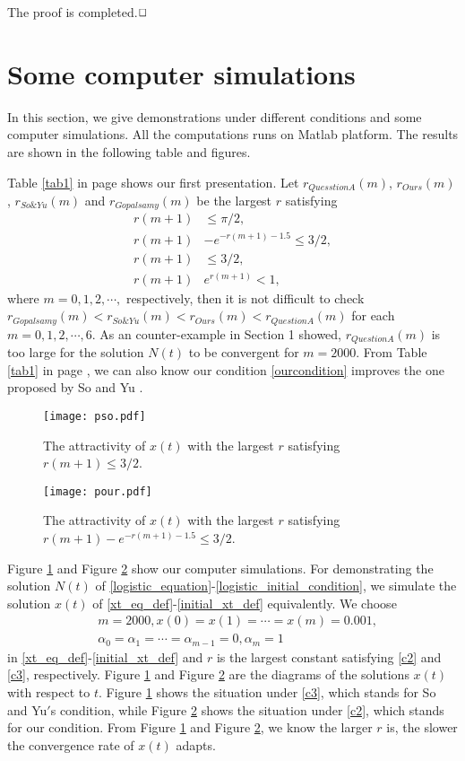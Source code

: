 \documentclass{HZNUMCM}
\begin{document}
The proof is completed.$\hfill\Box$


\section{Some computer simulations}

In this section, we give  demonstrations under different conditions and some computer simulations. All the computations runs on Matlab platform. The results are shown in the following table and figures.

Table \ref{tab1}  in page \pageref{tab1}  shows our first presentation. Let $r_{QuesstionA}(m)$, $r_{Ours}(m)$, $r_{So\&Yu}(m)$ and $r_{Gopalsamy}(m)$ be the largest $r$ satisfying
\begin{align}
r(m+1)&\leqslant \pi/2\label{c1},\\
r(m+1)&-e^{-r(m+1)-1.5}\leqslant 3/2\label{c2},\\
r(m+1)&\leqslant 3/2\label{c3},\\
r(m+1)&e^{r(m+1)}<1\label{c4},
\end{align}
where $m=0,1,2,\cdots,$ respectively,  then it is not difficult to check
$r_{Gopalsamy}(m)< r_{So\&Yu}(m)<r_{Ours}(m)<r_{QuestionA}(m)$
for each $m=0,1,2,\cdots,6.$ As an counter-example  in Section 1 showed, $r_{QuestionA}(m)$ is too large for the solution $N(t)$ to be convergent for $m=2000$.
 From Table \ref{tab1} in page \pageref{tab1}, we can also know our condition \eqref{ourcondition} improves the one proposed by So and Yu  \cite{1995_so_R1339824}.

\begin{figure}[!htb]
\centering
\texttt{[image: pso.pdf]}
 \caption{The attractivity of $x(t)$ with the largest $r$ satisfying $r(m+1)\leqslant3/2$.}\label{fig2}
\end{figure}
\begin{figure}[!htb]
\centering
 \texttt{[image: pour.pdf]}
 \caption{The attractivity of $x(t)$ with the largest $r$ satisfying {$r(m+1)-e^{-r(m+1)-1.5}\leqslant3/2$}.}\label{fig3}
\end{figure}

Figure \ref{fig2} and Figure \ref{fig3} show our  computer simulations.
For demonstrating the solution $N(t)$ of \eqref{logistic_equation}-\eqref{logistic_initial_condition}, we simulate the solution $x(t)$ of  \eqref{xt_eq_def}-\eqref{initial_xt_def}  equivalently. We choose
\begin{align*}
&m=2000,  x(0)=x(1)=\cdots=x(m)=0.001,\\
&\alpha_0=\alpha_1=\cdots=\alpha_{m-1}=0,\alpha_m=1
\end{align*}in \eqref{xt_eq_def}-\eqref{initial_xt_def} and $r$ is the largest constant satisfying  \eqref{c2} and \eqref{c3}, respectively. Figure \ref{fig2} and Figure \ref{fig3} are the diagrams of the  solutions $x(t)$ with respect to $t$. Figure \ref{fig2} shows the situation under \eqref{c3}, which stands for So and Yu$'$s condition, while Figure \ref{fig3} shows the situation under \eqref{c2}, which stands for   our condition.  From Figure \ref{fig2} and Figure \ref{fig3}, we   know the larger $r$ is, the slower the convergence rate of $x(t)$ adapts.
\end{document}
